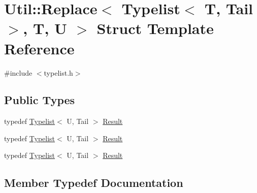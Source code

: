 \hypertarget{structUtil_1_1TL_1_1Replace_3_01Typelist_3_01T_00_01Tail_01_4_00_01T_00_01U_01_4}{}\section{Util\+:\+:Replace$<$ Typelist$<$ T, Tail $>$, T, U $>$ Struct Template Reference}
\label{structUtil_1_1TL_1_1Replace_3_01Typelist_3_01T_00_01Tail_01_4_00_01T_00_01U_01_4}


{\ttfamily \#include $<$typelist.\+h$>$}

\subsection*{Public Types}
\begin{DoxyCompactItemize}
\item 
typedef \mbox{\hyperlink{structUtil_1_1Typelist}{Typelist}}$<$ U, Tail $>$ \mbox{\hyperlink{structUtil_1_1TL_1_1Replace_3_01Typelist_3_01T_00_01Tail_01_4_00_01T_00_01U_01_4_a673e2d2a7c26a530c7015a04bde5a506}{Result}}
\item 
typedef \mbox{\hyperlink{structUtil_1_1Typelist}{Typelist}}$<$ U, Tail $>$ \mbox{\hyperlink{structUtil_1_1TL_1_1Replace_3_01Typelist_3_01T_00_01Tail_01_4_00_01T_00_01U_01_4_a673e2d2a7c26a530c7015a04bde5a506}{Result}}
\item 
typedef \mbox{\hyperlink{structUtil_1_1Typelist}{Typelist}}$<$ U, Tail $>$ \mbox{\hyperlink{structUtil_1_1TL_1_1Replace_3_01Typelist_3_01T_00_01Tail_01_4_00_01T_00_01U_01_4_a673e2d2a7c26a530c7015a04bde5a506}{Result}}
\end{DoxyCompactItemize}


\subsection{Member Typedef Documentation}
\mbox{\label{structUtil_1_1TL_1_1Replace_3_01Typelist_3_01T_00_01Tail_01_4_00_01T_00_01U_01_4_a673e2d2a7c26a530c7015a04bde5a506}} 
